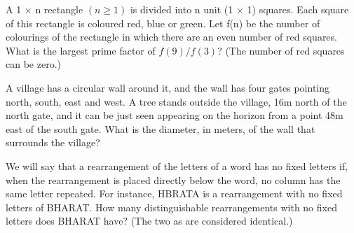 \item A 1 $\times$ n rectangle $(n \geq 1)$ is divided into n unit (1 $\times$ 1) squares. Each square of this rectangle is coloured red, blue or green. Let f(n) be the number of colourings of the rectangle in which there are an even number of red squares. What is the largest prime factor of $f(9)/f(3)$? (The number of red squares can be zero.)

\item A village has a circular wall around it, and the wall has four gates pointing north, south, east and west. A tree stands outside the village, 16m north of the north gate, and it can be just seen appearing on the horizon from a point 48m east of the south gate. What is the diameter, in meters, of the wall that surrounds the village?

\item  We will say that a rearrangement of the letters of a word has no fixed letters if, when the rearrangement is placed directly below the word, no column has the same letter repeated. For instance, HBRATA is a rearrangement with no fixed letters of BHARAT. How many distinguishable rearrangements with no fixed letters does BHARAT have? 
(The two as are considered identical.)
